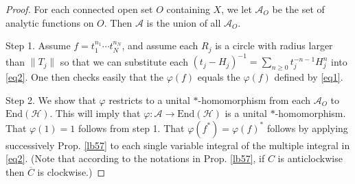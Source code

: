 \documentclass[12pt,a4paper,notitlepage]{article}
\theoremstyle{definition}
\theoremstyle{plain}
\newcommand{\mc}{\mathcal}
\newcommand{\ovl}{\overline}
\newcommand{\End}{\mathrm{End}} %
\numberwithin{equation}{section}
\begin{document}
\begin{proof}
For each connected open set $O$ containing $X$, we let $\mc A_O$ be the set  of  analytic functions on $O$. Then $\mc A$ is the union of all $\mc A_O$.

Step 1. Assume $ f=t_1^{n_1}\cdots t_N^{n_N}$, and assume each $R_j$ is a circle with radius larger than $\lVert T_j\lVert$ so that we can substitute each $(t_j-H_j)^{-1}=\sum_{n\geq 0}t_j^{-n-1}H_j^n$ into \eqref{eq2}. One then checks easily that the $\varphi( f)$ equals the $\varphi(f)$ defined by \eqref{eq1}. 

Step 2. We show that $\varphi$ restricts to a unital $*$-homomorphism from each $\mc A_O$ to $\End(\mc H)$. This will imply that $\varphi:\mc A\rightarrow\End(\mc H)$ is a unital $*$-homomorphism. That $\varphi(1)=1$ follows from step 1. That $\varphi(f^*)=\varphi(f)^*$ follows by applying successively Prop. \ref{lb57} to each single variable integral of the multiple integral in \eqref{eq2}. (Note that according to the notations in Prop. \ref{lb57}, if $C$ is anticlockwise then $\ovl C$ is clockwise.)


\end{proof}
\end{document}
